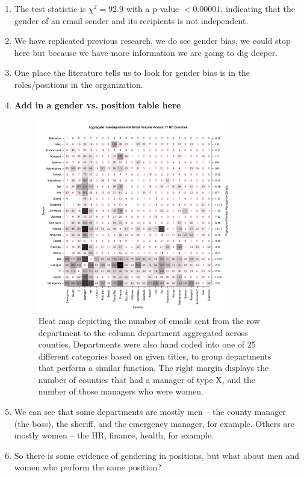 \documentclass[fleqn]{MJDArticle}
\begin{document}
\begin{enumerate}
	\item The test statistic is $\chi^2 = 92.9$ with a p-value $< 0.00001$, indicating that the gender of an email sender and its recipients is not independent. 
	
	\item We have replicated previous research, we do see gender bias, we could stop here but because we have more information we are going to dig deeper.

	\item One place the literature tells us to look for gender bias is in the roles/positions in the organization.
	
	\item \textbf{Add in a gender vs. position table here}
	
	\begin{figure}[H]
	\centering
	\includegraphics[width = 0.8\textwidth]{images/Aggregate_Email_Flows.pdf}
	\caption{\label{fig:heatmaps}Heat map depicting the number of emails sent from the row department to the column department aggregated across counties. Departments were also hand coded into one of 25 different categories based on given titles, to group departments that perform a similar function. The right margin displays the number of counties that had a manager of type X, and the number of those managers who were women.}
	\end{figure}
	
	\item We can see that some departments are mostly men -- the county manager (the boss), the sheriff, and the emergency manager, for example. Others are mostly women -- the HR, finance, health, for example. 
	\item So there is some evidence of gendering in positions, but what about men and women who perform the same position? 
	

\end{enumerate}
\end{document}
